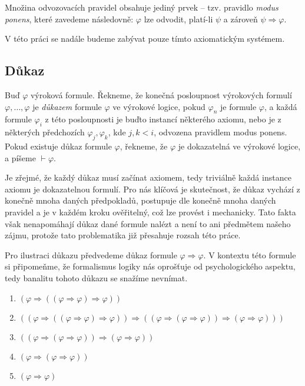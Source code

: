\documentclass[thesis=B,czech,hidelinks]{FITthesis}[2012/06/26]
\begin{document}
Množina odvozovacích pravidel obsahuje jediný prvek -- tzv. pravidlo \emph{modus ponens}, které zavedeme následovně: $\varphi$ lze odvodit, platí-li $\psi$ a zároveň $\psi \Rightarrow \varphi$.

V této práci se nadále budeme zabývat pouze tímto axiomatickým systémem.

\subsection{Důkaz}

\begin{df}
Buď $\varphi$ výroková formule. Řekneme, že konečná posloupnost výrokových formulí $\varphi , \ldots, \varphi$ je \emph{důkazem} formule $\varphi$ ve výrokové logice, pokud $\varphi_n$ je formule $\varphi$, a každá formule $\varphi_i$ z této posloupnosti je buďto instancí některého axiomu, nebo je z některých předchozích $\varphi_j, \varphi_k$, kde $j, k < i$, odvozena pravidlem modus ponens. Pokud existuje důkaz formule $\varphi$, řekneme, že $\varphi$ je dokazatelná ve výrokové logice, a píšeme $\vdash \varphi$.
\end{df}

Je zřejmé, že každý důkaz musí začínat axiomem, tedy triviálně každá instance axiomu je dokazatelnou formulí. Pro nás klíčová je skutečnost, že důkaz vychází z konečně mnoha daných předpokladů, postupuje dle konečně mnoha daných pravidel a je v každém kroku ověřitelný, což lze provést i mechanicky\cite{logika}. Tato fakta však nenapomáhají důkaz dané formule nalézt a není to ani předmětem našeho zájmu, protože tato problematika již přesahuje rozsah této práce.

\begin{ex}
\label{ex:proof}
	Pro ilustraci důkazu předvedeme důkaz formule $\varphi \Rightarrow \varphi$. V kontextu této formule si připomeňme, že formalismus logiky nás oprošťuje od psychologického aspektu, tedy banalitu tohoto důkazu se snažíme nevnímat.
	
	\begin{enumerate}
		\item $(\varphi \Rightarrow ((\varphi \Rightarrow \varphi) \Rightarrow \varphi))$
		\item $((\varphi \Rightarrow ((\varphi \Rightarrow \varphi) \Rightarrow \varphi)) \Rightarrow ((\varphi \Rightarrow (\varphi \Rightarrow \varphi)) \Rightarrow (\varphi \Rightarrow \varphi)))$
		\item $((\varphi \Rightarrow (\varphi \Rightarrow \varphi)) \Rightarrow (\varphi \Rightarrow \varphi))$
		\item $(\varphi \Rightarrow (\varphi \Rightarrow \varphi))$
		\item $(\varphi \Rightarrow \varphi)$
	\end{enumerate}
\end{ex}
\end{document}
